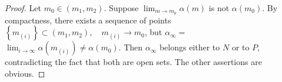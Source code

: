 \begin{proof}
  Let $m_0 \in\left(m_1, m_2\right)$. Suppose $\lim _{m \rightarrow m_0} \alpha(m)$ is not $\alpha\left(m_0\right)$. By compactness, there exists a sequence of points $\left\{m_{(i)}\right\} \subset\left(m_1, m_2\right), \quad m_{(i)} \rightarrow m_0$, but $\alpha_{\infty}=$ $\lim _{i \rightarrow \infty} \alpha\left(m_{(i)}\right) \neq \alpha\left(m_0\right)$. Then $\alpha_{\infty}$ belongs either to $N$ or to $P$, contradicting the fact that both are open sets. The other assertions are obvious.
\end{proof}